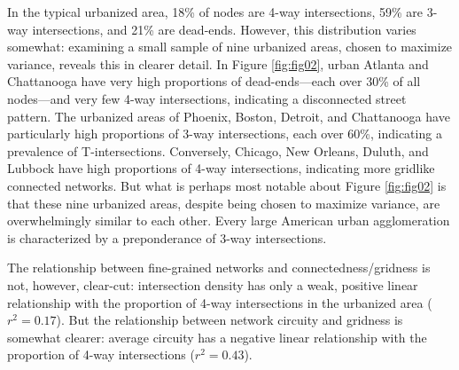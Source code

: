 \documentclass[Afour,sageh,times]{sagej}
\begin{document}
In the typical urbanized area, 18\% of nodes are 4-way intersections, 59\% are 3-way intersections, and 21\% are dead-ends. However, this distribution varies somewhat: examining a small sample of nine urbanized areas, chosen to maximize variance, reveals this in clearer detail. In Figure \ref{fig:fig02}, urban Atlanta and Chattanooga have very high proportions of dead-ends---each over 30\% of all nodes---and very few 4-way intersections, indicating a disconnected street pattern. The urbanized areas of Phoenix, Boston, Detroit, and Chattanooga have particularly high proportions of 3-way intersections, each over 60\%, indicating a prevalence of T-intersections. Conversely, Chicago, New Orleans, Duluth, and Lubbock have high proportions of 4-way intersections, indicating more gridlike connected networks. But what is perhaps most notable about Figure \ref{fig:fig02} is that these nine urbanized areas, despite being chosen to maximize variance, are overwhelmingly similar to each other. Every large American urban agglomeration is characterized by a preponderance of 3-way intersections.

The relationship between fine-grained networks and connectedness/gridness is not, however, clear-cut: intersection density has only a weak, positive linear relationship with the proportion of 4-way intersections in the urbanized area ($r^{2}=0.17$). But the relationship between network circuity and gridness is somewhat clearer: average circuity has a negative linear relationship with the proportion of 4-way intersections ($r^{2}=0.43$).
\end{document}
